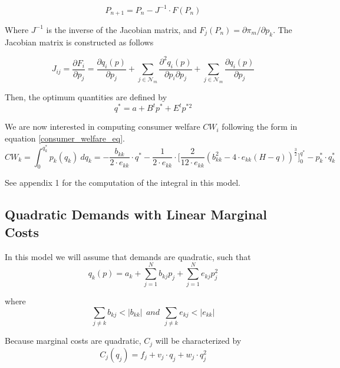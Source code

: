 \documentclass[12pt]{article}
\begin{document}
\begin{equation*}
P_{n+1} = P_n - J^{-1} \cdot F(P_n)
\end{equation*}

Where $J^{-1}$ is the inverse of the Jacobian matrix, and $F_j(P_n) = \partial \pi_m / \partial p_k$. The Jacobian matrix is constructed as follows

\begin{equation}
J_{ij} = \frac{\partial F_i}{\partial p_j} = \frac{\partial q_i(p)}{\partial p_j} + \sum_{j \in \mathcal{N}_m} \frac{\partial^2 q_i(p)}{\partial p_i \partial p_j} + \sum_{j \in \mathcal{N}_m} \frac{\partial q_i(p)}{\partial p_j}
\end{equation}

Then, the optimum quantities are defined by 
\begin{equation*}
q^* = a + B^t p^* + E^t p^{*2}
\end{equation*}

We are now interested in computing consumer welfare $CW_i$ following the form in equation \ref{consumer_welfare_eq}.
\begin{equation*}
CW_k = \int_0^{q_k^*} p_k(q_k) \ dq_k = -\frac{b_{kk}}{2 \cdot e_{kk}} \cdot q^* -\frac{1}{2 \cdot e_{kk}} \cdot \bigg[\frac{2}{12 \cdot e_{kk}} (b_{kk}^2 - 4 \cdot e_{kk}(H - q))^{\frac{3}{2}}\bigg]_0^{q^*} - p_k^* \cdot q_k^*
\end{equation*}

See appendix 1 for the computation of the integral in this model.  

\subsection{Quadratic Demands with Linear Marginal Costs}

In this model we will assume that demands are quadratic, such that
\begin{equation*}
q_k(p) = a_k + \sum_{j = 1}^N b_{kj} p_j + \sum_{j = 1}^N e_{kj}p_j^2
\end{equation*}

where
\begin{equation*}
\sum_{j \neq k} b_{kj} < |b_{kk}| \ \ and \ \ \sum_{j \neq k} e_{kj} < |e_{kk}|
\end{equation*}

Because marginal costs are quadratic, $C_j$ will be characterized by
\begin{equation*}
C_j(q_j) = f_j + v_j \cdot q_j + w_j \cdot q_j^2
\end{equation*}
\end{document}
